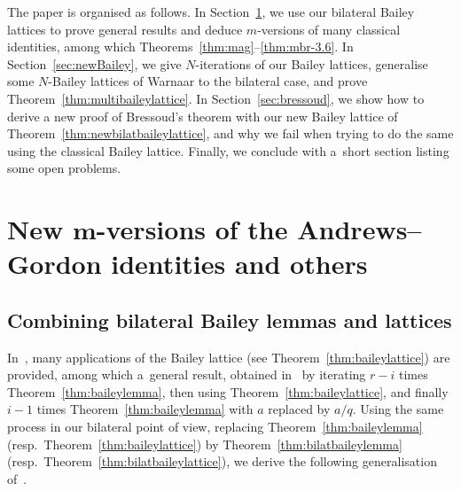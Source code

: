 \documentclass[pdftex]{sigma}
\numberwithin{equation}{section}
\begin{document}
The paper is organised as follows. In Section~\ref{sec:mAG}, we use our bilateral Bailey lattices to prove general results and deduce $m$-versions of many classical identities, among which Theorems~\ref{thm:mag}--\ref{thm:mbr-3.6}.
In Section~\ref{sec:newBailey}, we give $N$-iterations of our Bailey lattices, generalise some $N$-Bailey lattices of Warnaar to the bilateral case, and prove Theorem~\ref{thm:multibaileylattice}.
In Section~\ref{sec:bressoud}, we show how to derive a new proof of Bressoud's theorem with our new Bailey lattice of Theorem~\ref{thm:newbilatbaileylattice}, and why we fail when trying to do the same using the classical Bailey lattice. Finally, we conclude with a~short section listing some open problems.


\section[New m-versions of the Andrews--Gordon identities and others]{New $\boldsymbol{m}$-versions of the Andrews--Gordon identities and others}\label{sec:mAG}

\subsection{Combining bilateral Bailey lemmas and lattices}

In~\cite{AAB}, many applications of the Bailey lattice (see Theorem~\ref{thm:baileylattice}) are provided, among which a~general result, obtained in~\cite[Theorem~3.1]{AAB} by iterating $r-i$ times Theorem~\ref{thm:baileylemma}, then using Theorem~\ref{thm:baileylattice}, and finally $i-1$ times Theorem~\ref{thm:baileylemma} with $a$ replaced by $a/q$. Using the same process in our bilateral point of view, replacing Theorem~\ref{thm:baileylemma} (resp.\ Theorem~\ref{thm:baileylattice}) by Theorem~\ref{thm:bilatbaileylemma} (resp.\ Theorem~\ref{thm:bilatbaileylattice}), we derive the following generalisation of~\cite[Theorem~3.1]{AAB}.
\end{document}
